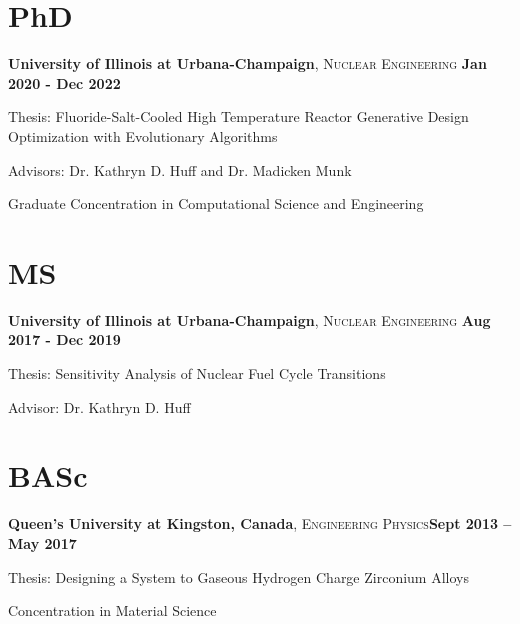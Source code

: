 \documentclass[margin,line]{resume}
\begin{document}
\begin{resume}
    \section{\mysidestyle PhD}
    \textbf{University of Illinois at Urbana-Champaign}, \textsc{Nuclear Engineering}\hfill \textbf{ Jan 2020 - Dec 2022}\vspace{-3mm}\\\vspace{-1mm}%
    \begin{list2}
        \item Thesis: Fluoride-Salt-Cooled High Temperature Reactor Generative
        Design Optimization with Evolutionary Algorithms
        \item Advisors:  Dr. Kathryn D. Huff and Dr. Madicken Munk
        \item Graduate Concentration in Computational Science and Engineering
    \end{list2}\vspace{-1.5mm}
    \section{\mysidestyle MS}
    \textbf{University of Illinois at Urbana-Champaign}, \textsc{Nuclear Engineering}\hfill \textbf{ Aug 2017 - Dec 2019}\vspace{-3mm}\\\vspace{-1mm}%
    \begin{list2}
        \item Thesis: Sensitivity Analysis of Nuclear Fuel Cycle Transitions
        \item Advisor:  Dr. Kathryn D. Huff
    \end{list2}\vspace{-1.5mm}

    \section{\mysidestyle BASc}
    \textbf{Queen’s University at Kingston, Canada}, \textsc{Engineering Physics}\hfill\textbf{Sept 2013 -- May 2017}\vspace{-3mm}\\\vspace{-1mm}%
    \begin{list2}
        \item Thesis: Designing a System to Gaseous Hydrogen Charge Zirconium Alloys
        \item Concentration in Material Science
    \end{list2}\vspace{-1.5mm}

\end{resume}
\end{document}
